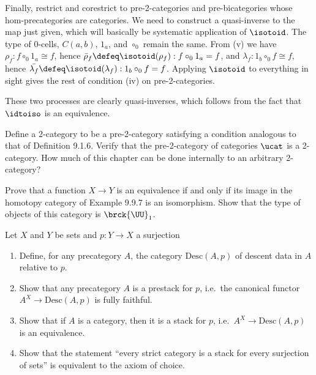 Finally, restrict and corestrict to pre-2-categories and pre-bicategories whose
hom-precategories are categories.  We need to construct a quasi-inverse to the
map just given, which will basically be systematic application of $\isotoid$.
The type of 0-cells, $C(a, b)$, $1_{a}$, and $\circ_{0}$ remain the same.  From
(v) we have $\rho_{f} : f \circ_{0} 1_{a} \cong f$, hence $\bar{\rho}_{f}
\defeq \isotoid(\rho_{f}) : f \circ_{0} 1_{a} = f$, and $\lambda_{f} : 1_{b}
\circ_{0} f \cong f$, hence $\bar{\lambda_{f}} \defeq \isotoid(\lambda_{f}) :
1_{b} \circ_{0} f = f$.  Applying $\isotoid$ to everything in sight gives the
rest of condition (iv) on pre-2-categories.


These two processes are clearly quasi-inverses, which follows from the fact
that $\idtoiso$ is an equivalence.


Define a 2-category to be a pre-2-category satisfying a condition analogous to
that of Definition 9.1.6.  Verify that the pre-2-category of categories $\ucat$
is a 2-category.  How much of this chapter can be done internally to an
arbitrary 2-category?


      

Prove that a function $X \to Y$ is an equivalence if and only if its image in
the homotopy category of Example 9.9.7 is an isomorphism.  Show that the type
of objects of this category is $\brck{\UU}_{1}$.


    

Let $X$ and $Y$ be sets and $p : Y \to X$ a surjection
\begin{enumerate}
  \item Define, for any precategory $A$, the category $\mathrm{Desc}(A, p)$ of
  descent data in $A$ relative to $p$.
  \item  Show that any precategory $A$ is a prestack for $p$, i.e.~the
  canonical functor $A^{X} \to \mathrm{Desc}(A, p)$ is fully faithful.
  \item Show that if $A$ is a category, then it is a stack for $p$,
      i.e.~$A^{X} \to \mathrm{Desc}(A, p)$ is an equivalence.
  \item Show that the statement ``every strict category is a stack for every
      surjection of sets'' is equivalent to the axiom of choice.
\end{enumerate}
\begin{coqdoccode}
\end{coqdoccode}
